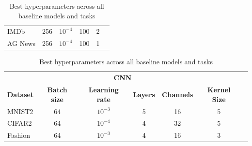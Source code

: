 \documentclass[../main.tex]{subfiles}
\begin{document}
\begin{table}[h!]
\begin{tabular}{lccccc}
IMDb & 256 & $10^{-4}$ & 100 & 2 \\
AG News & 256 & $10^{-4}$ & 100 & 1 \\
\bottomrule
\end{tabular}
\begin{tabular}{lcccccc}
\toprule
\multicolumn{6}{c}{\textbf{CNN}} \\
\textbf{Dataset} & \textbf{Batch size} & \textbf{Learning rate} & \textbf{Layers} & \textbf{Channels} & \textbf{Kernel Size} \\
\midrule
MNIST2 & 64 & $10^{-3}$ & 5 & 16 & 5 \\
CIFAR2 & 64 & $10^{-4}$ & 4 & 32 & 5 \\
Fashion & 64 & $10^{-3}$ & 4 & 16 & 3 \\
\bottomrule
\end{tabular}
\caption{Best hyperparameters across all baseline models and tasks}
\label{tab:hyp-baseline}
\end{table}
\end{document}
